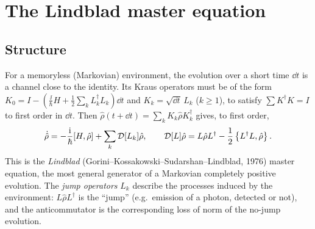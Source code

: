 \section{The Lindblad master equation}
\subsection{Structure}
For a memoryless (Markovian) environment, the evolution over a short time $\dd t$ is a channel close to the identity. Its Kraus operators must be of the form
$K_0=I-(\frac\ii\hbar H+\frac12\sum_kL_k^\dagger L_k)\dd t$ and $K_k=\sqrt{\dd t}\,L_k$ ($k\ge1$), to satisfy $\sum K^\dagger K=I$ to first order in $\dd t$. Then
$\hat\rho(t+\dd t)=\sum_kK_k\hat\rho K_k^\dagger$ gives, to first order,
\begin{equation}\label{eq:lindblad}
  \dot{\hat\rho}=-\frac{\mathrm i}\hbar[H,\hat\rho]+\sum_k\mathcal D[L_k]\hat\rho,\qquad\mathcal D[L]\hat\rho=L\hat\rho L^\dagger-\frac12\left\{L^\dagger L,\hat\rho\right\}.
\end{equation}
This is the \emph{Lindblad} (Gorini--Kossakowski--Sudarshan--Lindblad, 1976) master equation, the most general generator of a Markovian completely positive evolution.
The \emph{jump operators} $L_k$ describe the processes induced by the environment: $L\hat\rho L^\dagger$ is the ``jump'' (e.g.\ emission of a photon, detected or not), and the
anticommutator is the corresponding loss of norm of the no-jump evolution.

